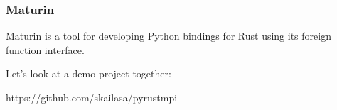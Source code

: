 \begin{frame}
    \frametitle{Maturin}
    Maturin is a tool for developing Python bindings for Rust using its foreign function interface.

    \hspace*{0.5pt}

    Let's look at a demo project together:

    \hspace*{0.5pt}

    \large https://github.com/skailasa/pyrustmpi

\end{frame}



